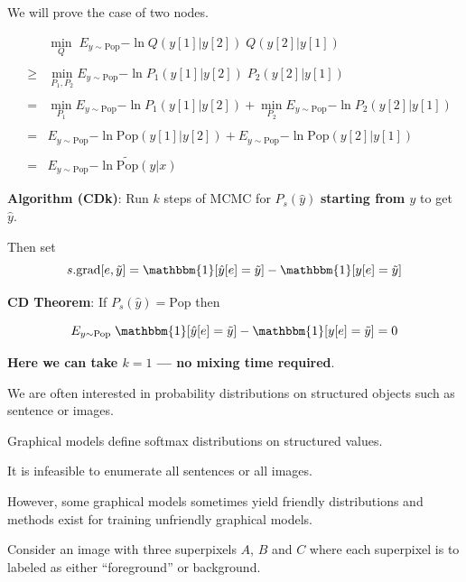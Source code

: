 {We will prove the case of two nodes.

\vfill
\begin{eqnarray*}
  & & \min_Q \;E_{y\sim \mathrm{Pop}}{-\ln Q(y[1]|y[2])\;Q(y[2]|y[1])} \\
  \\
  & \geq & \min_{P_1,P_2} E_{y \sim \mathrm{Pop}}{-\ln P_1(y[1]|y[2])\;P_2(y[2]|y[1])} \\
  \\
  & = & \min_{P_1} E_{y \sim \mathrm{Pop}}{-\ln P_1(y[1]|y[2])} + \min_{P_2} E_{y \sim \mathrm{Pop}}{-\ln P_2(y[2]|y[1])} \\
  \\
  & = & E_{y \sim \mathrm{Pop}}{-\ln \mathrm{Pop}(y[1]|y[2])} + E_{y \sim \mathrm{Pop}}{-\ln \mathrm{Pop}(y[2]|y[1])} \\
  \\
  & = & E_{y \sim \mathrm{Pop}}{-\ln \widetilde{\mathrm{Pop}}(y|x)}
\end{eqnarray*}

  
{\bf Algorithm (CDk)}: Run $k$ steps of MCMC for $P_s(\hat{y})$ {\bf starting from $y$} to get $\hat{y}$.

\vfill
Then set
$$s.\mathrm{grad}[e,\tilde{y}] = \mathbbm{1}[\hat{y}[e] = \tilde{y}] - \mathbbm{1}[y[e]= \tilde{y}]$$

\vfill
    {\bf CD Theorem}: If $P_s(\hat{y}) = \mathrm{Pop}$ then
    
    $$E_{y \sim \mathrm{Pop}}\; \mathbbm{1}[\hat{y}[e] = \tilde{y}] - \mathbbm{1}[y[e]= \tilde{y}] = 0$$

\vfill
{\bf Here we can take $k=1$ --- \bf no mixing time required}.


We are often interested in probability distributions on structured objects such as sentence or images.

\vfill
Graphical models define softmax distributions on structured values.

\vfill
It is infeasible to enumerate all sentences or all images.

\vfill
However, some graphical models sometimes yield friendly distributions and methods exist
for training unfriendly graphical models.

}



Consider an image with three superpixels $A$, $B$ and $C$ where
each superpixel is to labeled as either ``foreground'' or background.

